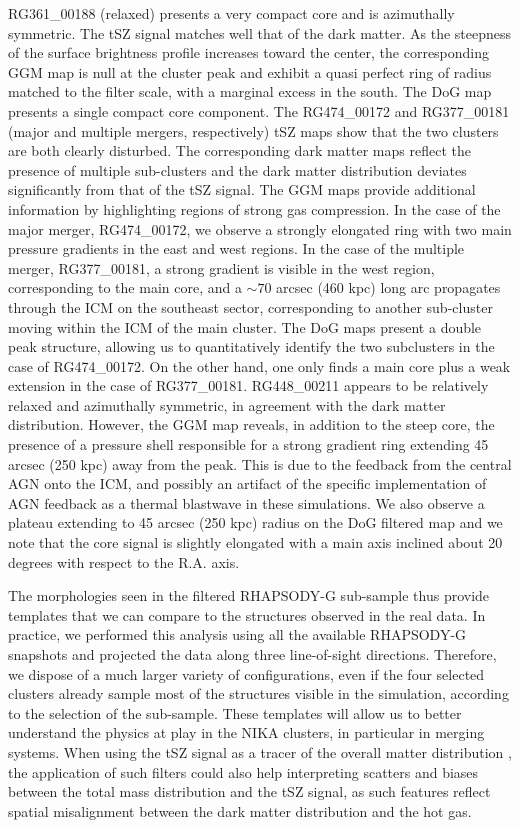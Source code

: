 \documentclass[twocolumn,traditabstract]{aa}
\begin{document}
RG361\_00188 (relaxed) presents a very compact core and is azimuthally symmetric. The tSZ signal matches well that of the dark matter. As the steepness of the surface brightness profile increases toward the center, the corresponding GGM map is null at the cluster peak and exhibit a quasi perfect ring of radius matched to the filter scale, with a marginal excess in the south. The DoG map presents a single compact core component. The RG474\_00172 and RG377\_00181 (major and multiple mergers, respectively) tSZ maps show that the two clusters are both clearly disturbed. The corresponding dark matter maps reflect the presence of multiple sub-clusters and the dark matter distribution deviates significantly from that of the tSZ signal. The GGM maps provide additional information by highlighting regions of strong gas compression. In the case of the major merger, RG474\_00172, we observe a strongly elongated ring with two main pressure gradients in the east and west regions. In the case of the multiple merger, RG377\_00181, a strong gradient is visible in the west region, corresponding to the main core, and a $\sim 70$ arcsec (460 kpc) long arc propagates through the ICM on the southeast sector, corresponding to another sub-cluster moving within the ICM of the main cluster. The DoG maps present a double peak structure, allowing us to quantitatively identify the two subclusters in the case of RG474\_00172. On the other hand, one only finds a main core plus a weak extension in the case of RG377\_00181. RG448\_00211 appears to be relatively relaxed and azimuthally symmetric, in agreement with the dark matter distribution. However, the GGM map reveals, in addition to the steep core, the presence of a pressure shell responsible for a strong gradient ring extending 45 arcsec (250 kpc) away from the peak. This is due to the feedback from the central AGN onto the ICM, and possibly an artifact of the specific implementation of AGN feedback as a thermal blastwave in these simulations. We also observe a plateau extending to 45 arcsec (250 kpc) radius on the DoG filtered map and we note that the core signal is slightly elongated with a main axis inclined about 20 degrees with respect to the R.A. axis.

The morphologies seen in the filtered RHAPSODY-G sub-sample thus provide templates that we can compare to the structures observed in the real data. In practice, we performed this analysis using all the available RHAPSODY-G snapshots and projected the data along three line-of-sight directions. Therefore, we dispose of a much larger variety of configurations, even if the four selected clusters already sample most of the structures visible in the simulation, according to the selection of the sub-sample. These templates will allow us to better understand the physics at play in the NIKA clusters, in particular in merging systems. When using the tSZ signal as a tracer of the overall matter distribution \citep[e.g.,][]{Adam2015,Adam2016a,Ruppin2016}, the application of such filters could also help interpreting scatters and biases between the total mass distribution and the tSZ signal, as such features reflect spatial misalignment between the dark matter distribution and the hot gas.
\end{document}
